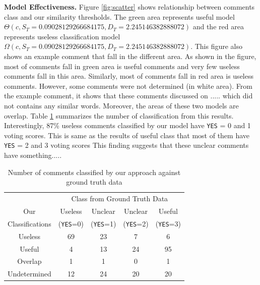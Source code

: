 \documentclass[conference]{IEEEtran}
\begin{document}
\textbf{Model Effectiveness.} Figure \ref{fig:scatter} shows relationship between comments class and our similarity thresholds. The green area represents useful model $\Theta(c,S_T=0.09028129266684175,D_T= 2.245146382888072)$ and the red area represents useless classification model $\Omega(c,S_T=0.09028129266684175,D_T= 2.245146382888072)$. This figure also shows an example comment that fall in the different area. As shown in the figure, most of comments fall in green area is useful comments and very few useless comments fall in this area. Similarly, most of comments fall in red area is useless comments. However, some comments were not determined (in white area). From the example comment, it shows that these comments discussed on ..... which did not contains any similar words. Moreover, the areas of these two models are overlap. Table \ref{tb:classify_number} summarizes the number of classification from this results. Interestingly, 87\% useless comments classified by our model have \texttt{YES} = 0 and 1 voting scores. This is same as the results of useful class that most of them have \texttt{YES} = 2 and 3 voting scores
This finding suggests that these unclear comments have something.....

\begin{table}[h]
\centering
\small
\caption{Number of comments classified by our approach against ground truth data }
\begin{tabular}{ccccc}
\hline
& \multicolumn{4}{c}{Class from Ground Truth Data} \\ \cline{2-5}
Our&  Useless  & Unclear  & Unclear & Useful \\
Classifications&  (\texttt{YES}=0) & (\texttt{YES}=1) & (\texttt{YES}=2) & (\texttt{YES}=3) \\
\hline \hline
Useless & 69 & 23 & 7 & 6 \\
Useful & 4 & 13 & 24 & 95 \\
Overlap & 1 & 1 & 0 & 1 \\
Undetermined & 12 & 24 & 20 & 20 \\
\hline
\end{tabular}
\label{tb:classify_number}
\end{table}
\end{document}
